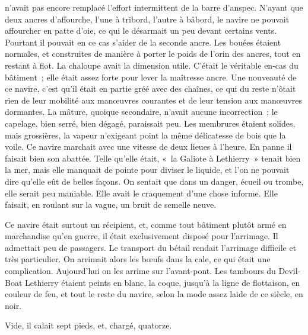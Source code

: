 \documentclass[french,twoside]{book} %
\begin{document}
n’avait pas encore remplacé l’effort intermittent de la barre d’anspec. N’ayant que deux ancres d’affourche, l’une à tribord, l’autre à bâbord, le navire ne pouvait affourcher en patte d’oie, ce qui le désarmait un peu devant certains vents. Pourtant il pouvait en ce cas s’aider de la seconde ancre. Les bouées étaient normales, et construites de manière à porter le poids de l’orin des ancres, tout en restant à flot. La chaloupe avait la dimension utile. C’était le véritable en-cas du bâtiment ; elle était assez forte pour lever la maîtresse ancre. Une nouveauté de ce navire, c’est qu’il était en partie gréé avec des chaînes, ce qui du reste n’ôtait rien de leur mobilité aux manœuvres courantes et de leur tension aux manœuvres dormantes. La mâture, quoique secondaire, n’avait aucune incorrection ; le capelage, bien serré, bien dégagé, paraissait peu. Les membrures étaient solides, mais grossières, la vapeur n’exigeant point la même délicatesse de bois que la voile. Ce navire marchait avec une vitesse de deux lieues à l’heure. En panne il faisait bien son abattée. Telle qu’elle était, « la Galiote à Lethierry » tenait bien la mer, mais elle manquait de pointe pour diviser le liquide, et l’on ne pouvait dire qu’elle eût de belles  façons. On sentait que dans un danger, écueil ou trombe, elle serait peu maniable. Elle avait le craquement d’une chose informe. Elle faisait, en roulant sur la vague, un bruit de semelle neuve.\par
Ce navire était surtout un récipient, et, comme tout bâtiment plutôt armé en marchandise qu’en guerre, il était exclusivement disposé pour l’arrimage. Il admettait peu de passagers. Le transport du bétail rendait l’arrimage difficile et très particulier. On arrimait alors les bœufs dans la cale, ce qui était une complication. Aujourd’hui on les arrime sur l’avant-pont. Les tambours du Devil-Boat Lethierry étaient peints en blanc, la coque, jusqu’à la ligne de flottaison, en couleur de feu, et tout le reste du navire, selon la mode assez laide de ce siècle, en noir.\par
Vide, il calait sept pieds, et, chargé, quatorze.\par
\end{document}
